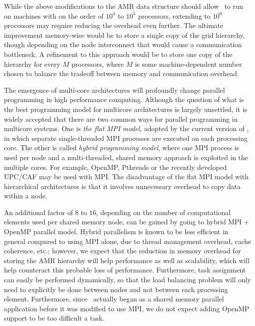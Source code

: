 \documentclass{article}
\begin{document}
   While the above modifications to the AMR data structure should allow
   \enzo\ to run on machines with on the order of $10^4$ to $10^5$
   processors, extending to $10^6$ processors may require reducing the
   overhead even further.  The ultimate improvement memory-wise would
   be to store a single copy of the grid hierarchy, though depending
   on the node interconnect that would cause a communication
   bottleneck.  A refinement to this approach would be to store one
   copy of the hierarchy for every $M$ processors, where $M$ is some
   machine-dependent number chosen to balance the tradeoff between
   memory and communication overhead.

  The emergence of multi-core architectures will profoundly change
  parallel programming in high performance computing. Although the
  question of what is the best programming model for multicore
  architectures is largely unsettled, it is widely accepted that there
  are two common ways for parallel programming in multicore systems.
  One is \emph{the flat MPI model}, adopted by the current version of
  \enzo, in which separate single-threaded MPI processes are executed
  on each processing core. The other is called \emph{hybrid
  programming model}, where one MPI process is used per node and a
  multi-threaded, shared memory approach is exploited in the multiple
  cores. For example, OpenMP, Pthreads or the recently developed
  UPC/CAF may be used with MPI.  The disadvantage of the flat MPI
  model with hierarchical architectures is that it involves
  unnecessary overhead to copy data within a node.

  An additional factor of $8$ to $16$, depending on the number of
  computational elements used per shared memory node, can be gained by
  going to hybrid MPI + OpenMP parallel model.  Hybrid parallelism is
  known to be less efficient in general compared to using MPI alone,
  due to thread management overhead, cache coherence, etc.; however,
  we expect that the reduction in memory overhead for storing the AMR
  hierarchy will help performance as well as scalability, which will
  help counteract this probable loss of performance.  Furthermore,
  task assignment can easily be performed dynamically, so that the
  load balancing problem will only need to explicitly be done between
  nodes and not between each processing element.  Furthermore, since
  \enzo\ actually began as a shared memory parallel application before
  it was modified to use MPI, we do not expect adding OpenMP support
  to be too difficult a task. %
\end{document}

